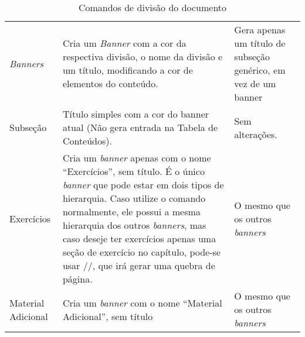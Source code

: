 \begin{table}[H]
\begin{tabular}{l*{2}{p{.4\linewidth}}}
		\addlinespace
		\emph{Banners}        & Cria um \emph{Banner} com a cor da respectiva divisão, o nome da divisão e um título, modificando a cor de elementos do conteúdo.                                                                                                                                                                                                                                                 & Gera apenas um título de subseção genérico, em vez de um banner \\
		Subseção              & Título simples com a cor do banner atual (Não gera entrada na Tabela de Conteúdos).                                                                                                                                                                                                                                                                                               & Sem alterações.                                                 \\
		\addlinespace
		Exercícios            & Cria um \emph{banner} apenas com o nome \enquote{Exercícios}, sem título. É o único \emph{banner} que pode estar em dois tipos de hierarquia. Caso utilize o comando normalmente, ele possui a mesma hierarquia dos outros \emph{banners}, mas caso deseje ter exercícios apenas uma seção de exercício no capítulo, pode-se usar \latexinline/\exercise[section]/, que irá gerar
		uma quebra de página. & O mesmo que os outros \emph{banners}                                                                                                                                                                                                                                                                                                                                                                                                                \\
		\addlinespace
		Material Adicional    & Cria um \emph{banner} com o nome \enquote{Material Adicional}, sem título                                                                                                                                                                                                                                                                                                         & O mesmo que os outros \emph{banners}                            \\
		\bottomrule
	\end{tabular}
	\caption{Comandos de divisão do documento}\label{tab:divisoes-formatacao}
\end{table}


